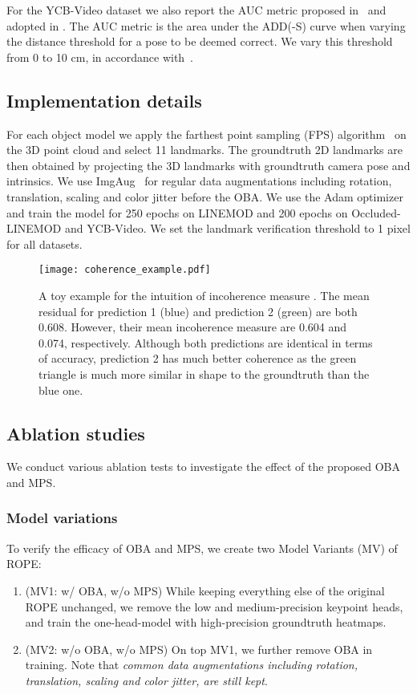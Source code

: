 \documentclass[10pt,twocolumn,letterpaper]{article}
\begin{document}
For the YCB-Video dataset we also report the AUC metric proposed in~\cite{Xiang2018posecnn} and adopted in \cite{Oberweger2018making, Peng2019pvnet}. The AUC metric is the area under the ADD(-S) curve when varying the distance threshold for a pose to be deemed correct. We vary this threshold from 0 to 10 cm, in accordance with~\cite{Xiang2018posecnn}. 



\subsection{Implementation details}
For each object model we apply the farthest point sampling (FPS) algorithm~\cite{Peng2019pvnet} on the 3D point cloud and select 11 landmarks. The groundtruth 2D landmarks are then obtained by projecting the 3D landmarks with groundtruth camera pose and intrinsics. 
We use ImgAug~\cite{imgaug} for regular data augmentations including rotation, translation, scaling and color jitter before the OBA. We use the Adam optimizer~\cite{Kingma2015adam} and train the model for 250 epochs on LINEMOD and 200 epochs on Occluded-LINEMOD and YCB-Video. We set the landmark verification threshold  to 1 pixel for all datasets.


\begin{figure}[t]
    \centering
    \texttt{[image: coherence\_example.pdf]}
    \caption{A toy example for the intuition of incoherence measure . The mean residual  for prediction 1 (blue) and prediction 2 (green) are both 0.608. However, their mean incoherence measure  are 0.604 and 0.074, respectively. Although both predictions are identical in terms of accuracy, prediction 2 has much better coherence as the green triangle is much more similar in shape to the groundtruth than the blue one.}
    \label{fig:cohere}
\end{figure}


\subsection{Ablation studies}
\label{sec:ablation}
We conduct various ablation tests to investigate the effect of the proposed OBA and MPS. 

\subsubsection{Model variations}
\label{sec:mvs}

To verify the efficacy of OBA and MPS, we create two Model Variants (MV) of ROPE: 
\begin{enumerate}
    \item (MV1: w/ OBA, w/o MPS) While keeping everything else of the original ROPE unchanged, we remove the low and medium-precision keypoint heads, and train the one-head-model with high-precision groundtruth heatmaps.
    
    \item (MV2: w/o OBA, w/o MPS) On top MV1, we further remove OBA in training. Note that \emph{common data augmentations including rotation, translation, scaling and color jitter, are still kept}. 
\end{enumerate}
\end{document}
